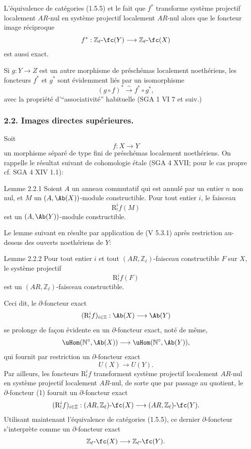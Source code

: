 L'équivalence de catégories (1.5.5) et le fait que \(f^*\) transforme système projectif localement \(AR\)-nul en système projectif localement \(AR\)-nul  alors que le foncteur image réciproque
\[
f^*:\mathbb{Z}_\ell\text{-}\fc(Y)\longrightarrow \mathbb{Z}_\ell\text{-}\fc(X)
\]
est aussi exact.

Si \(g:Y\to Z\) est un autre morphisme de préschémas localement noethériens, les foncteurs \(f^*\) et \(g^*\) sont évidemment liés par un isomorphisme
\[
(g\circ f)^*\xrightarrow{\sim}f^*\circ g^*,
\]
avec la propriété d'``associativité'' habituelle (SGA 1 VI 7 et suiv.)

\subsubsection*{2.2. Images directes supérieures.}

Soit
\[
f:X\longrightarrow Y
\]
un morphisme séparé de type fini de préschémas localement noethériens. On rappelle le résultat suivant de cohomologie étale (SGA 4 XVII; pour le cas propre cf. SGA 4 XIV 1.1):

\begin{statement}{Lemme 2.2.1}
Soient \(A\) un anneau commutatif qui est annulé par un entier \(n\) non nul, et \(M\) un \((A,\Ab(X))\)-module constructible. Pour tout entier \(i\), le faisceau
\[
\mathrm{R}^i_!f(M)
\]
est un \((A,\Ab(Y))\)-module constructible.
\end{statement}

Le lemme suivant en résulte par application de (V 5.3.1) après restriction au-dessus des ouverts noethériens de \(Y\):

\begin{statement}{Lemme 2.2.2}
Pour tout entier \(i\) et tout \((AR,\mathbb{Z}_\ell)\)-faisceau constructible \(F\) sur \(X\), le système projectif
\[
\mathrm{R}^i_!f(F)
\]
est un \((AR,\mathbb{Z}_\ell)\)-faisceau constructible.
\end{statement}

Ceci dit, le \(\partial\)-foncteur exact
\[
(\mathrm{R}^i_!f)_{i\in\mathbb{Z}}:\Ab(X)\longrightarrow \Ab(Y)
\]
se prolonge de façon évidente en un \(\partial\)-foncteur exact, noté de même,
\[
\uHom(\mathbb{N}^\circ,\Ab(X))\longrightarrow \uHom(\mathbb{N}^\circ,\Ab(Y)),
\]
qui fournit par restriction un \(\partial\)-foncteur exact
\[
U(X)\longrightarrow U(Y).
\tag{1}
\]
Par ailleurs, les foncteurs \(\mathrm{R}^i_!f\) transforment système projectif localement \(AR\)-nul en système projectif localement \(AR\)-nul, de sorte que par passage au
quotient, le \(\partial\)-foncteur (1) fournit un \(\partial\)-foncteur exact\[
(\mathrm{R}^i_!f)_{i\in\mathbb{Z}}:(AR,\mathbb{Z}_\ell)\text{-}\fc(X)
\longrightarrow (AR,\mathbb{Z}_\ell)\text{-}\fc(Y).
\]
Utilisant maintenant l'équivalence de catégories (1.5.5), ce dernier \(\partial\)-foncteur s'interprète comme un \(\partial\)-foncteur exact
\[
\mathbb{Z}_\ell\text{-}\fc(X)\longrightarrow \mathbb{Z}_\ell\text{-}\fc(Y).
\]

